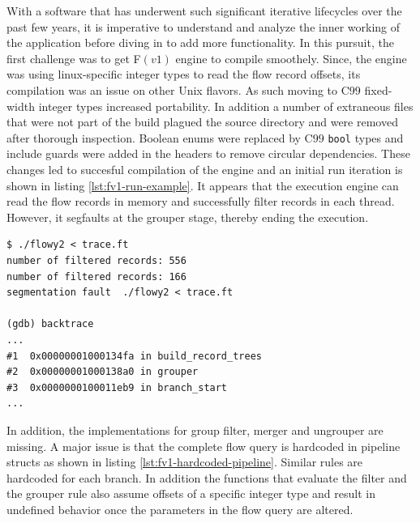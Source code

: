 With a software that has underwent such significant iterative lifecycles over
the past few years, it is imperative to understand and analyze the inner
working of the application before diving in to add more functionality. In this
pursuit, the first challenge was to get F$(v1)$ engine to compile smoothely.
Since, the engine was using linux-specific integer types to read the flow
record  offsets, its compilation was
an issue on other Unix flavors. As such moving to C$99$ \cite{c99:1999}
fixed-width integer types increased portability. In addition a number of
extraneous files that were not part of the build plagued the source directory
and were removed after thorough inspection. Boolean enums were replaced by
C$99$ \texttt{bool} types and include guards were added in the headers to
remove circular dependencies. These changes led to succesful compilation of
the engine and an initial run iteration is shown in listing
\ref{lst:fv1-run-example}. It appears that the execution engine can read the
flow records in memory and successfully filter records in each thread.
However, it segfaults at the grouper stage, thereby ending the execution.

\begin{lstlisting}
$ ./flowy2 < trace.ft
number of filtered records: 556
number of filtered records: 166
segmentation fault  ./flowy2 < trace.ft

(gdb) backtrace
...
#1  0x00000001000134fa in build_record_trees
#2  0x00000001000138a0 in grouper
#3  0x0000000100011eb9 in branch_start
...
\end{lstlisting}

In addition, the implementations for group filter, merger and ungrouper are
missing. A major issue is that the complete flow query is hardcoded in
pipeline 
structs as shown in listing \ref{lst:fv1-hardcoded-pipeline}. Similar rules
are hardcoded for each branch. In addition the functions that evaluate the
filter and the grouper rule also assume offsets of a specific integer type and
result in undefined behavior once the parameters in the flow query are
altered.

